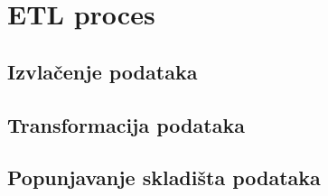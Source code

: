 \section{ETL proces}

\subsection{Izvlačenje podataka}
\subsection{Transformacija podataka}
\subsection{Popunjavanje skladišta podataka}